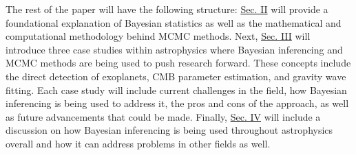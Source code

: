 \documentclass[twocolumn,linenumbers]{aastex631}
\begin{document}
The rest of the paper will have the following structure: \hyperref[placeholder]{Sec. II} will provide a foundational explanation of Bayesian statistics as well as the mathematical and computational methodology behind MCMC methods. Next, \hyperref[placeholder]{Sec. III} will introduce three case studies within astrophysics where Bayesian inferencing and MCMC methods are being used to push research forward. These concepts include the direct detection of exoplanets, CMB parameter estimation, and gravity wave fitting. Each case study will include current challenges in the field, how Bayesian inferencing is being used to address it, the pros and cons of the approach, as well as future advancements that could be made. Finally, \hyperref[placeholder]{Sec. IV} will include a discussion on how Bayesian inferencing is being used throughout astrophysics overall and how it can address problems in other fields as well.


\end{document}
